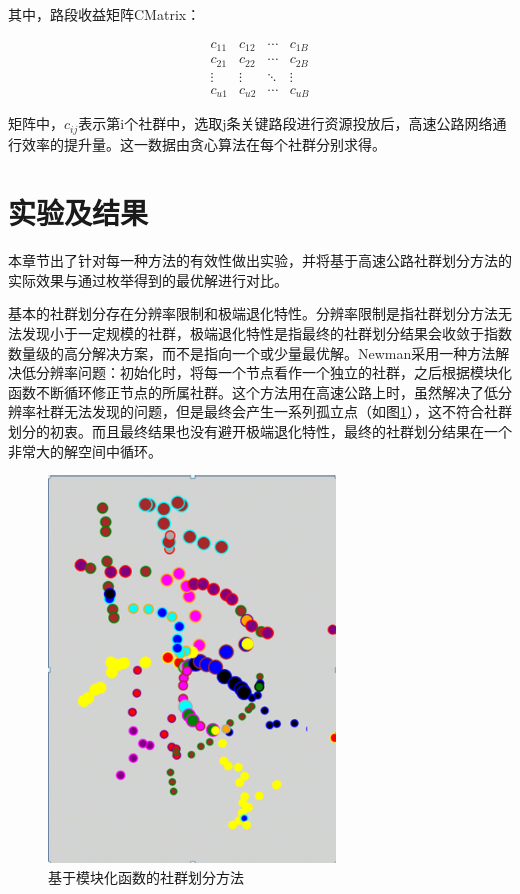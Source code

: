 		    	其中，路段收益矩阵CMatrix：

				\[\begin{array}{*{20}{c}}
				  {{c_{11}}}&{{c_{12}}}& \cdots &{{c_{1B}}} \\ 
				  {{c_{21}}}&{{c_{22}}}& \cdots &{{c_{2B}}} \\ 
				   \vdots & \vdots & \ddots & \vdots  \\ 
				  {{c_{u1}}}&{{c_{u2}}}& \cdots &{{c_{uB}}} 
				\end{array}\]
				
				矩阵中，$c_{ij}$表示第i个社群中，选取j条关键路段进行资源投放后，高速公路网络通行效率的提升量。这一数据由贪心算法在每个社群分别求得。

	\section{实验及结果}
		本章节出了针对每一种方法的有效性做出实验，并将基于高速公路社群划分方法的实际效果与通过枚举得到的最优解进行对比。

		基本的社群划分存在分辨率限制和极端退化特性。分辨率限制是指社群划分方法无法发现小于一定规模的社群，极端退化特性是指最终的社群划分结果会收敛于指数数量级的高分解决方案，而不是指向一个或少量最优解。Newman\parencite{NewmanFast}采用一种方法解决低分辨率问题：初始化时，将每一个节点看作一个独立的社群，之后根据模块化函数不断循环修正节点的所属社群。这个方法用在高速公路上时，虽然解决了低分辨率社群无法发现的问题，但是最终会产生一系列孤立点（如图\ref{gulidian}），这不符合社群划分的初衷。而且最终结果也没有避开极端退化特性，最终的社群划分结果在一个非常大的解空间中循环。

			\begin{figure}[h]
			\centering
					\begin{minipage}{0.8\linewidth}
						\centering
						\includegraphics[width=3in]{picture/liuliangbianquan}
						\caption{基于模块化函数的社群划分方法}
						\label{gulidian}
					\end{minipage}
			\end{figure}

